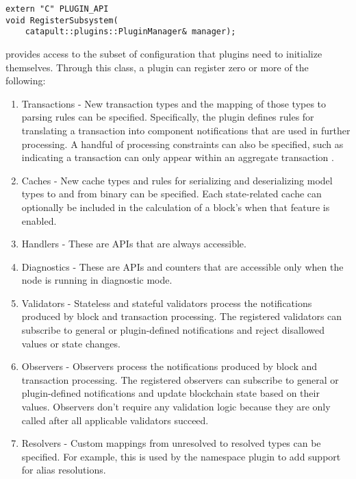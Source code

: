 \begin{lstlisting}
extern "C" PLUGIN_API
void RegisterSubsystem(
	catapult::plugins::PluginManager& manager);
\end{lstlisting}

 provides access to the subset of configuration that plugins need to initialize themselves.
Through this class, a plugin can register zero or more of the following:

\begin{enumerate}
	\item{Transactions -
		New transaction types and the mapping of those types to parsing rules can be specified.
		Specifically, the plugin defines rules for translating a transaction into component notifications that are used in further processing.
		A handful of processing constraints can also be specified, such as indicating a transaction can only appear within an aggregate transaction .
	}
	\item{Caches -
		New cache types and rules for serializing and deserializing model types to and from binary can be specified.
		Each state-related cache can optionally be included in the calculation of a block's   when that feature is enabled.
	}
	\item{Handlers - These are APIs that are always accessible.}
	\item{Diagnostics - These are APIs and counters that are accessible only when the node is running in diagnostic mode.}
	\item{Validators -
		Stateless and stateful validators process the notifications produced by block and transaction processing.
		The registered validators can subscribe to general or plugin-defined notifications and reject disallowed values or state changes.
	}
	\item{Observers -
		Observers process the notifications produced by block and transaction processing.
		The registered observers can subscribe to general or plugin-defined notifications and update blockchain state based on their values.
		Observers don't require any validation logic because they are only called after all applicable validators succeed.
	}
	\item{Resolvers -
		Custom mappings from unresolved to resolved types can be specified.
		For example, this is used by the namespace plugin to add support for alias resolutions.
	}
\end{enumerate}

